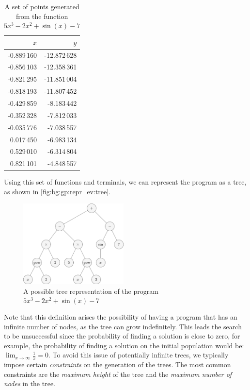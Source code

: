   \begin{table}[ht!]
    \centering
    \begin{tabular}{|r|r|}
      \hline
      \(x\) & \(y\) \\
      \hline
      \hline
      -0.889\,160    & -12.872\,628 \\
      \hline
      -0.856\,103   & -12.358\,361 \\
      \hline
      -0.821\,295   & -11.851\,004 \\
      \hline
      -0.818\,193   & -11.807\,452 \\
      \hline
      -0.429\,859   & -8.183\,442  \\
      \hline
      -0.352\,328   & -7.812\,033  \\
      \hline
      -0.035\,776   & -7.038\,557  \\
      \hline
      0.017\,450  & -6.983\,134  \\
      \hline
      0.529\,010    & -6.314\,804 \\
      \hline
      0.821\,101    & -4.848\,557  \\
      \hline
    \end{tabular}
    \caption{
      A set of points generated from the function \(5x^3 - 2x^2 + \sin(x) - 7\)
    }
    \label{tab:bg:gp:repr_ev:points}
  \end{table}

  Using this set of functions and terminals, we can represent the program as a
  tree, as shown in \vref{fig:bg:gp:repr_ev:tree}.

  \begin{figure}[ht!]
    \centering
    \includegraphics[width=0.4875\textwidth]{img/theoretical_framework/Expected Expression Tree.png}
    \caption{
      A possible tree representation of the program \(5x^3 - 2x^2 + \sin(x) - 7\)
    }
    \label{fig:bg:gp:repr_ev:tree}
  \end{figure}

  Note that this definition arises the possibility of having a program that
  has an infinite number of nodes, as the tree can grow indefinitely.
  This leads the search to be unsuccessful since the probability of finding a
  solution is close to zero, for example, the probability of finding a solution
  on the initial population would be: \(\lim_{x \to \infty} \frac{1}{x} = 0\).
  To avoid this issue of potentially infinite trees, we typically impose certain
  \emph{constraints} on the generation of the trees.
  The most common constraints are the \emph{maximum height} of the tree and the
  \emph{maximum number of nodes} in the tree.
